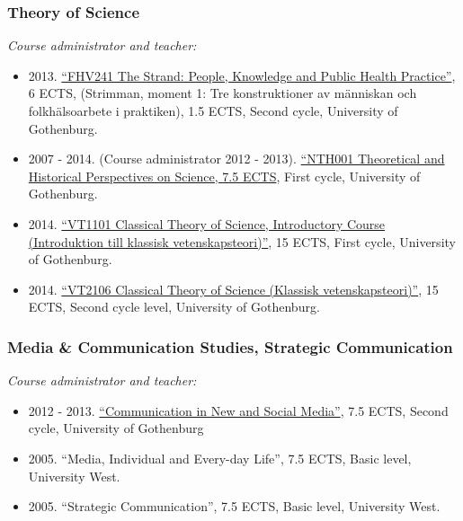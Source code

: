 \documentclass[a4paper,11pt,oneside]{article}
\begin{document}
{        \subsubsection{Theory of Science}
        \noindent \emph{Course administrator and teacher:}
        \begin{itemize}
          \item 2013. \href{http://files.christopherkullenberg.se/kursplaner/FHV241Strimman.pdf}{``FHV241 The Strand: People, Knowledge and Public Health Practice''}, 6 ECTS, (Strimman, moment 1: Tre konstruktioner av människan och folkhälsoarbete i praktiken), 1.5 ECTS, Second cycle, University of Gothenburg.
          \item 2007 - 2014. (Course administrator 2012 - 2013). \href{http://files.christopherkullenberg.se/kursplaner/NTH001_Teoretiska_och_historiska_perspektiv_pa%cc%8a_naturvetenskap_10512.pdf}{``NTH001 Theoretical and Historical Perspectives on Science, 7.5 ECTS}, First cycle, University of Gothenburg.
          \item 2014. \href{http://files.christopherkullenberg.se/kursplaner/VT1101_Introduktion_i_klassisk_vetenskapsteori__grundkurs_13185.pdf}{``VT1101 Classical Theory of Science, Introductory Course (Introduktion till klassisk vetenskapsteori)''}, 15 ECTS, First cycle, University of Gothenburg.
          \item 2014. \href{http://files.christopherkullenberg.se/kursplaner/VT2106_Klassisk_vetenskapsteori_13187.pdf}{``VT2106 Classical Theory of Science (Klassisk vetenskapsteori)''}, 15 ECTS, Second cycle level, University of Gothenburg.
        \end{itemize}

        \subsubsection{Media \& Communication Studies, Strategic Communication}
             \noindent \emph{Course administrator and teacher:}
             \begin{itemize}
               \item 2012 - 2013. \href{http://files.christopherkullenberg.se/kursplaner/KT2102.pdf}{``Communication in New and Social Media''}, 7.5 ECTS, Second cycle, University of Gothenburg
               \item 2005. ``Media, Individual and Every-day Life'', 7.5 ECTS, Basic level, University West.
               \item 2005. ``Strategic Communication'', 7.5 ECTS, Basic level, University West.
             \end{itemize}

}
\end{document}
